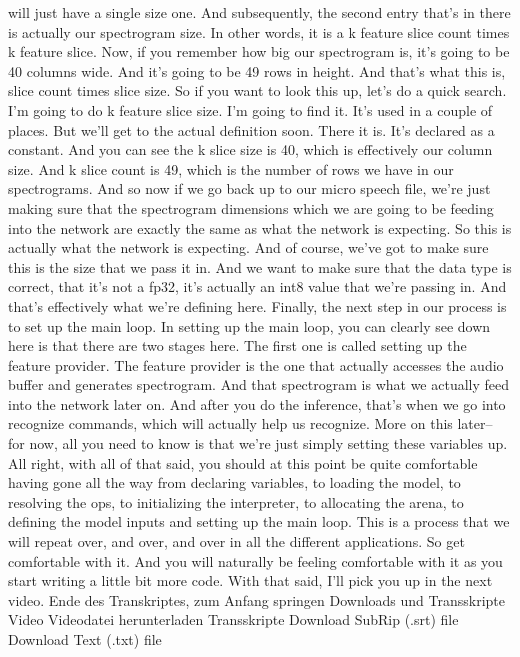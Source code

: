     will just have a single size one.
    And subsequently, the second entry that's in there
    is actually our spectrogram size.
    In other words, it is a k feature slice count times k feature slice.
    Now, if you remember how big our spectrogram is,
    it's going to be 40 columns wide.
    And it's going to be 49 rows in height.
    And that's what this is, slice count times slice size.
    So if you want to look this up, let's do a quick search.
    I'm going to do k feature slice size.
    I'm going to find it.
    It's used in a couple of places.
    But we'll get to the actual definition soon.
    There it is.
    It's declared as a constant.
    And you can see the k slice size is 40, which is effectively our column size.
    And k slice count is 49, which is the number
    of rows we have in our spectrograms.
    And so now if we go back up to our micro speech file,
    we're just making sure that the spectrogram dimensions which
    we are going to be feeding into the network
    are exactly the same as what the network is expecting.
    So this is actually what the network is expecting.
    And of course, we've got to make sure this is the size that we pass it in.
    And we want to make sure that the data type is correct, that it's not a fp32,
    it's actually an int8 value that we're passing in.
    And that's effectively what we're defining here.
    Finally, the next step in our process is to set up the main loop.
    In setting up the main loop, you can clearly
    see down here is that there are two stages here.
    The first one is called setting up the feature provider.
    The feature provider is the one that actually accesses the audio buffer
    and generates spectrogram.
    And that spectrogram is what we actually feed into the network later on.
    And after you do the inference, that's when
    we go into recognize commands, which will actually help us recognize.
    More on this later-- for now, all you need to know
    is that we're just simply setting these variables up.
    All right, with all of that said, you should at this point
    be quite comfortable having gone all the way from declaring variables,
    to loading the model, to resolving the ops, to initializing the interpreter,
    to allocating the arena, to defining the model inputs
    and setting up the main loop.
    This is a process that we will repeat over, and over, and over
    in all the different applications.
    So get comfortable with it.
    And you will naturally be feeling comfortable with it
    as you start writing a little bit more code.
    With that said, I'll pick you up in the next video.
    Ende des Transkriptes, zum Anfang springen
    Downloads und Transskripte
    Video
    Videodatei herunterladen
    Transskripte
    Download SubRip (.srt) file
    Download Text (.txt) file        
    
